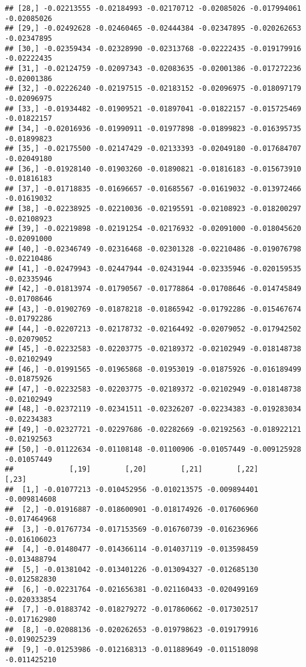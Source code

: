 \documentclass[
]{article}
\begin{document}
\begin{verbatim}
## [28,] -0.02213555 -0.02184993 -0.02170712 -0.02085026 -0.017994061 -0.02085026
## [29,] -0.02492628 -0.02460465 -0.02444384 -0.02347895 -0.020262653 -0.02347895
## [30,] -0.02359434 -0.02328990 -0.02313768 -0.02222435 -0.019179916 -0.02222435
## [31,] -0.02124759 -0.02097343 -0.02083635 -0.02001386 -0.017272236 -0.02001386
## [32,] -0.02226240 -0.02197515 -0.02183152 -0.02096975 -0.018097179 -0.02096975
## [33,] -0.01934482 -0.01909521 -0.01897041 -0.01822157 -0.015725469 -0.01822157
## [34,] -0.02016936 -0.01990911 -0.01977898 -0.01899823 -0.016395735 -0.01899823
## [35,] -0.02175500 -0.02147429 -0.02133393 -0.02049180 -0.017684707 -0.02049180
## [36,] -0.01928140 -0.01903260 -0.01890821 -0.01816183 -0.015673910 -0.01816183
## [37,] -0.01718835 -0.01696657 -0.01685567 -0.01619032 -0.013972466 -0.01619032
## [38,] -0.02238925 -0.02210036 -0.02195591 -0.02108923 -0.018200297 -0.02108923
## [39,] -0.02219898 -0.02191254 -0.02176932 -0.02091000 -0.018045620 -0.02091000
## [40,] -0.02346749 -0.02316468 -0.02301328 -0.02210486 -0.019076798 -0.02210486
## [41,] -0.02479943 -0.02447944 -0.02431944 -0.02335946 -0.020159535 -0.02335946
## [42,] -0.01813974 -0.01790567 -0.01778864 -0.01708646 -0.014745849 -0.01708646
## [43,] -0.01902769 -0.01878218 -0.01865942 -0.01792286 -0.015467674 -0.01792286
## [44,] -0.02207213 -0.02178732 -0.02164492 -0.02079052 -0.017942502 -0.02079052
## [45,] -0.02232583 -0.02203775 -0.02189372 -0.02102949 -0.018148738 -0.02102949
## [46,] -0.01991565 -0.01965868 -0.01953019 -0.01875926 -0.016189499 -0.01875926
## [47,] -0.02232583 -0.02203775 -0.02189372 -0.02102949 -0.018148738 -0.02102949
## [48,] -0.02372119 -0.02341511 -0.02326207 -0.02234383 -0.019283034 -0.02234383
## [49,] -0.02327721 -0.02297686 -0.02282669 -0.02192563 -0.018922121 -0.02192563
## [50,] -0.01122634 -0.01108148 -0.01100906 -0.01057449 -0.009125928 -0.01057449
##             [,19]        [,20]        [,21]        [,22]        [,23]
##  [1,] -0.01077213 -0.010452956 -0.010213575 -0.009894401 -0.009814608
##  [2,] -0.01916887 -0.018600901 -0.018174926 -0.017606960 -0.017464968
##  [3,] -0.01767734 -0.017153569 -0.016760739 -0.016236966 -0.016106023
##  [4,] -0.01480477 -0.014366114 -0.014037119 -0.013598459 -0.013488794
##  [5,] -0.01381042 -0.013401226 -0.013094327 -0.012685130 -0.012582830
##  [6,] -0.02231764 -0.021656381 -0.021160433 -0.020499169 -0.020333854
##  [7,] -0.01883742 -0.018279272 -0.017860662 -0.017302517 -0.017162980
##  [8,] -0.02088136 -0.020262653 -0.019798623 -0.019179916 -0.019025239
##  [9,] -0.01253986 -0.012168313 -0.011889649 -0.011518098 -0.011425210

\end{verbatim}
\end{document}

